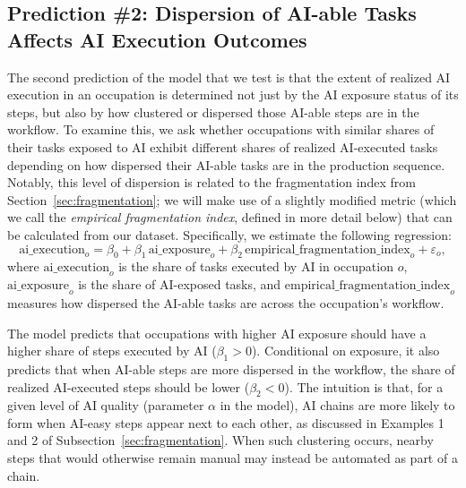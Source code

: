 \subsection{Prediction \#2: Dispersion of AI-able Tasks Affects AI Execution Outcomes}
\label{sec:fragmentation_prediction}

The second prediction of the model that we test is that the extent of realized AI execution in an occupation is determined not just by the AI exposure status of its steps, but also by how clustered or dispersed those AI-able steps are in the workflow.
To examine this, we ask whether occupations with similar shares of their tasks exposed to AI exhibit different shares of realized AI-executed tasks depending on how dispersed their AI-able tasks are in the production sequence. 
Notably, this level of dispersion is related to the fragmentation index from Section~\ref{sec:fragmentation}; we will make use of a slightly modified metric (which we call the \emph{empirical fragmentation index}, defined in more detail below) that can be calculated from our dataset.
Specifically, we estimate the following regression:
\begin{equation}
    \text{ai\_execution}_{o} = \beta_0 + \beta_1 \, \text{ai\_exposure}_{o} + \beta_2 \, \text{empirical\_fragmentation\_index}_{o} + \varepsilon_o,
    \label{eq:fragmentation_index_regression}
\end{equation}
where \emph{$\text{ai\_execution}_{o}$} is the share of tasks executed by AI in occupation $o$, \emph{$\text{ai\_exposure}_{o}$} is the share of AI-exposed tasks, and \emph{$\text{empirical\_fragmentation\_index}_{o}$} measures how dispersed the AI-able tasks are across the occupation's workflow.

The model predicts that occupations with higher AI exposure should have a higher share of steps executed by AI ($\beta_1 > 0$).
Conditional on exposure, it also predicts that when AI-able steps are more dispersed in the workflow, the share of realized AI-executed steps should be lower ($\beta_2 < 0$).
The intuition is that, for a given level of AI quality (parameter $\alpha$ in the model), AI chains are more likely to form when AI-easy steps appear next to each other, as discussed in Examples 1 and 2 of Subsection~\ref{sec:fragmentation}.
When such clustering occurs, nearby steps that would otherwise remain manual may instead be automated as part of a chain.

